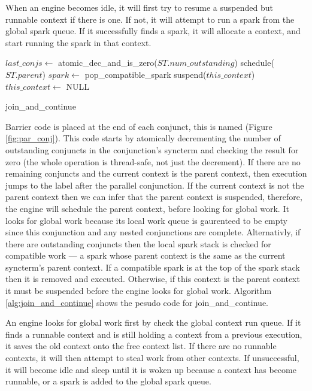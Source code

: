 
When an engine becomes idle, it will first try
to resume a suspended but runnable context if there is one.
If not, it will attempt to run a spark from the global spark queue.
If it successfully finds a spark, it will allocate a context,
and start running the spark in that context.


\begin{algorithm}
\begin{algorithmic}
  \State $last\_conjs \gets$ atomic\_dec\_and\_is\_zero($ST.num\_outstanding$)
    \Else
      \State schedule($ST.parent$)
    \EndIf
  \Else
    \State $spark \gets$ pop\_compatible\_spark
    \Else
         \State suspend($this\_context$)
         \State $this\_context \gets$ NULL
      \EndIf
    \EndIf
  \EndIf
\EndProcedure
\end{algorithmic}
\caption{join\_and\_continue}
\label{alg:join_and_continue}
\end{algorithm}

Barrier code is placed at the end of each conjunct,
this is named  (Figure \ref{fig:par_conj}).
This code starts by atomically decrementing the number of outstanding
conjuncts in the conjunction's syncterm and checking the result for zero
(the whole operation is thread-safe, not just the decrement).
If there are no remaining conjuncts and the current context is the parent
context,
then execution jumps to the label after the parallel conjunction.
If the current context is not the parent context then
we can infer that the parent context is suspended,
therefore, 
the engine will schedule the parent context, before looking for global work.
It looks for global work because its local work queue is gaurenteed to be
empty since this conjunction and any nested conjunctions are complete.
Alternativly, if there are outstanding conjuncts then
the local spark stack is checked for compatible work ---
a spark whose parent context is the same as the current syncterm's parent
context.
If a compatible spark is at the top of the spark stack then it is removed
and executed.
Otherwise,
if this context is the parent context it must be suspended
before the engine looks for global work.
Algorithm \ref{alg:join_and_continue} shows the pesudo code for
join\_and\_continue.

An engine looks for global work first by check the global context run queue.
If it finds a runnable context and is still holding a context from a
previous execution, it saves the old context onto the free context list.
If there are no runnable contexts,
it will then attempt to steal work from other contexts.
If unsuccessful, it will become idle and sleep
until it is woken up because a context has become runnable,
or a spark is added to the global spark queue.
